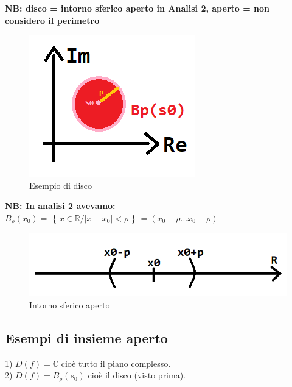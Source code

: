\textbf{NB: disco = intorno sferico aperto in Analisi 2, aperto = non considero il perimetro}

\begin{figure}[h]
	\centering
	\includegraphics[scale=0.75]{immagini/disco}
	\caption{ Esempio di disco }
	\label{fig: esempioDisco}
\end{figure}


\textbf{NB: In analisi 2 avevamo: } \\
$ B_{\rho}(x_{0}) = $ \{ $ x \in \mathbb{R} / |x-x_{0}| < \rho $ \} $ = ( x_{0}-\rho ... x_{0}+\rho) $

\begin{figure}[h]
	\centering
	\includegraphics[scale=0.5]{immagini/intornoSfericoAperto}
	\caption{ Intorno sferico aperto }
	\label{fig: intornoSfericoAperto}
\end{figure}

\subsection*{Esempi di insieme aperto}
1) $ D(f) = \mathbb{C} $ cioè tutto il piano complesso.\\
2) $ D(f) = B_{\rho}(s_{0})$ cioè il disco (visto prima).\\

\pagebreak

